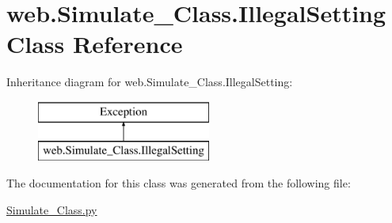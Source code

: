 \hypertarget{classweb_1_1_simulate___class_1_1_illegal_setting}{\section{web.\-Simulate\-\_\-\-Class.\-Illegal\-Setting Class Reference}
\label{classweb_1_1_simulate___class_1_1_illegal_setting}
}
Inheritance diagram for web.\-Simulate\-\_\-\-Class.\-Illegal\-Setting\-:\begin{figure}[H]
\begin{center}
\leavevmode
\includegraphics[height=2.000000cm]{classweb_1_1_simulate___class_1_1_illegal_setting}
\end{center}
\end{figure}


The documentation for this class was generated from the following file\-:\begin{DoxyCompactItemize}
\item 
\hyperlink{_simulate___class_8py}{Simulate\-\_\-\-Class.\-py}\end{DoxyCompactItemize}
